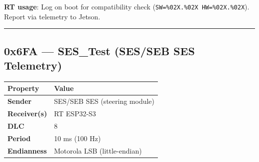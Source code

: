 \textbf{RT usage}: Log on boot for compatibility check
(\texttt{SW=\%02X.\%02X\ HW=\%02X.\%02X}). Report via telemetry to Jetson.

\begin{center}\rule{0.5\linewidth}{0.5pt}\end{center}

\subsection{0x6FA --- SES\_Test (SES/SEB SES
Telemetry)}\label{x6fa-ses_test-SES/SEB-SES-telemetry}

\begin{longtable}[]{@{}ll@{}}
\toprule\noalign{}
Property & Value \\
\midrule\noalign{}
\endhead
\bottomrule\noalign{}
\endlastfoot
\textbf{Sender} & SES/SEB SES (steering module) \\
\textbf{Receiver(s)} & RT ESP32-S3 \\
\textbf{DLC} & 8 \\
\textbf{Period} & 10 ms (100 Hz) \\
\textbf{Endianness} & Motorola LSB (little-endian) \\
\end{longtable}

